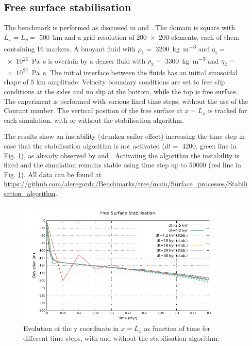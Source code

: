 \documentclass[hidelinks,10pt,a4paper]{article}
\begin{document}
\subsection{Free surface stabilisation}\label{sec:stab}
The benchmark is performed as discussed in \citet{Kaus2010a} and \citet{Thieulot2014}. The domain is square with $L_x=L_y=$ \SI{500}{\km} and a grid resolution
of \num{200x200} elements, each of them containing 16 markers. A buoyant fluid with $\rho_1=$ \SI{3200}{\kg\per\cubic\metre} and $\eta_1=$ \SI{e20}{\pascal\s}
is overlain by a denser fluid with $\rho_2=$ \SI{3300}{\kg\per\cubic\metre} and $\eta_2=$ \SI{e21}{\pascal\s}. The initial interface between the fluids has an
initial sinusoidal shape of 5 km amplitude. Velocity boundary conditions are set to free slip conditions at the sides and no slip at the bottom, while the top
is free surface. The experiment is performed with various fixed time steps, without the use of the Courant number. The vertical position of the free surface at
$x=L_x$ is tracked for each simulation, with or without the stabilisation algorithm.

The results show an instability (drunken sailor effect) increasing the time step in case that the stabilisation algorithm is not activated
($dt=$ \SI{4200}{\year}, green line in Fig. \ref{fig:stab}), as already observed by \citet{Kaus2010a} and \citet{Thieulot2014}. Activating the algorithm the
instability is fixed and the simulation remains stable using time step up to \SI{50000}{\year} (red line in Fig. \ref{fig:stab}). All data can be 
found at \url{https://github.com/aleregorda/Benchmarks/tree/main/Surface_processes/Stabilisation_algorithm}.

\begin{figure}
\centering
\noindent\includegraphics[width=400px]{./Figures/Kaus_random.pdf}
\caption{Evolution of the y coordinate in $x=L_x$ as function of time for different time steps, with and without the stabilisation algorithm.}
\label{fig:stab}
\end{figure}
\end{document}
